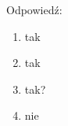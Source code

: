Odpowiedź:
\begin{enumerate}
    \item tak
    \item tak
    \item tak?%
    \item nie
\end{enumerate}